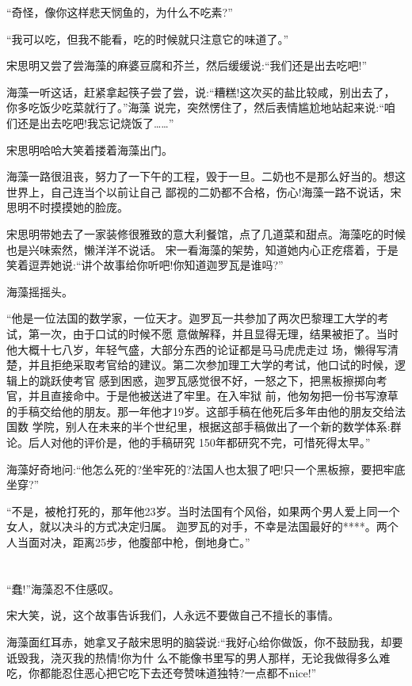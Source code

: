 \documentclass[11pt,a4paper,onecolumn]{article}
\begin{document}
``奇怪，像你这样悲天悯鱼的，为什么不吃素?''

``我可以吃，但我不能看，吃的时候就只注意它的味道了。''

宋思明又尝了尝海藻的麻婆豆腐和芥兰，然后缓缓说:``我们还是出去吃吧!''

海藻一听这话，赶紧拿起筷子尝了尝，说:``糟糕!这次买的盐比较咸，别出去了，你多吃饭少吃菜就行了。''海藻
说完，突然愣住了，然后表情尴尬地站起来说:``咱们还是出去吃吧!我忘记烧饭了……''

宋思明哈哈大笑着搂着海藻出门。

海藻一路很沮丧，努力了一下午的工程，毁于一旦。二奶也不是那么好当的。想这世界上，自己连当个以前让自己
鄙视的二奶都不合格，伤心!海藻一路不说话，宋思明不时摸摸她的脸庞。

宋思明带她去了一家装修很雅致的意大利餐馆，点了几道菜和甜点。海藻吃的时候也是兴味索然，懒洋洋不说话。
宋一看海藻的架势，知道她内心正疙瘩着，于是笑着逗弄她说:``讲个故事给你听吧!你知道迦罗瓦是谁吗?''

海藻摇摇头。

``他是一位法国的数学家，一位天才。迦罗瓦一共参加了两次巴黎理工大学的考试，第一次，由于口试的时候不愿
意做解释，并且显得无理，结果被拒了。当时他大概十七八岁，年轻气盛，大部分东西的论证都是马马虎虎走过
场，懒得写清楚，并且拒绝采取考官给的建议。第二次参加理工大学的考试，他口试的时候，逻辑上的跳跃使考官
感到困惑，迦罗瓦感觉很不好，一怒之下，把黑板擦掷向考官，并且直接命中。于是他被送进了牢里。在入牢狱
前，他匆匆把一份书写潦草的手稿交给他的朋友。那一年他才19岁。这部手稿在他死后多年由他的朋友交给法国数
学院，别人在未来的半个世纪里，根据这部手稿做出了一个新的数学体系:群论。后人对他的评价是，他的手稿研究
150年都研究不完，可惜死得太早。''

海藻好奇地问:``他怎么死的?坐牢死的?法国人也太狠了吧!只一个黑板擦，要把牢底坐穿?''

``不是，被枪打死的，那年他23岁。当时法国有个风俗，如果两个男人爱上同一个女人，就以决斗的方式决定归属。
迦罗瓦的对手，不幸是法国最好的****。两个人当面对决，距离25步，他腹部中枪，倒地身亡。''

\section[\thesection]{}

``蠢!''海藻忍不住感叹。

宋大笑，说，这个故事告诉我们，人永远不要做自己不擅长的事情。

海藻面红耳赤，她拿叉子敲宋思明的脑袋说:``我好心给你做饭，你不鼓励我，却要诋毁我，浇灭我的热情!你为什
么不能像书里写的男人那样，无论我做得多么难吃，你都能忍住恶心把它吃下去还夸赞味道独特?一点都不nice!''
\end{document}

